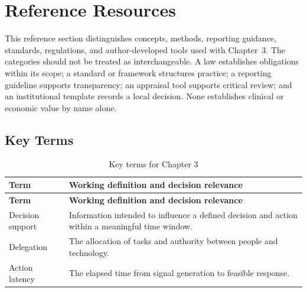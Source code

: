 \section{Reference Resources}
\label{sec:comp-ch03-reference}

This reference section distinguishes concepts, methods, reporting guidance,
standards, regulations, and author-developed tools used with Chapter~3. The
categories should not be treated as interchangeable. A law establishes obligations
within its scope; a standard or framework structures practice; a reporting guideline
supports transparency; an appraisal tool supports critical review; and an
institutional template records a local decision. None establishes clinical or
economic value by name alone. 

\subsection{Key Terms}
\begin{longtable}{@{}p{}p{}@{}}
\caption{Key terms for Chapter 3}
\label{tab:comp-ch03-key-terms}\\
\toprule
\textbf{Term} & \textbf{Working definition and decision relevance} \\
\midrule
\endfirsthead
\toprule
\textbf{Term} & \textbf{Working definition and decision relevance} \\
\midrule
\endhead
\bottomrule
\endlastfoot
Decision support & Information intended to influence a defined decision and action within a meaningful time window. \\
Delegation & The allocation of tasks and authority between people and technology. \\
Action latency & The elapsed time from signal generation to feasible response. \\
\end{longtable}

